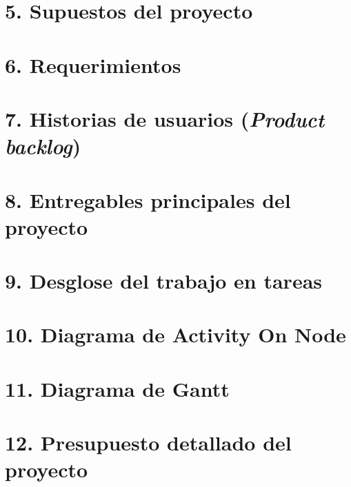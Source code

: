 \documentclass[
11pt, %
codirector, %
]{charter}
\begin{document}


\section{5. Supuestos del proyecto}
\label{sec:supuestos}



\section{6. Requerimientos}
\label{sec:requerimientos}



\section{7. Historias de usuarios (\textit{Product backlog})}
\label{sec:backlog}



\section{8. Entregables principales del proyecto}
\label{sec:entregables}



\section{9. Desglose del trabajo en tareas}
\label{sec:wbs}



\section{10. Diagrama de Activity On Node}
\label{sec:AoN}



\section{11. Diagrama de Gantt}
\label{sec:gantt}



\section{12. Presupuesto detallado del proyecto}
\label{sec:presupuesto}
\end{document}
